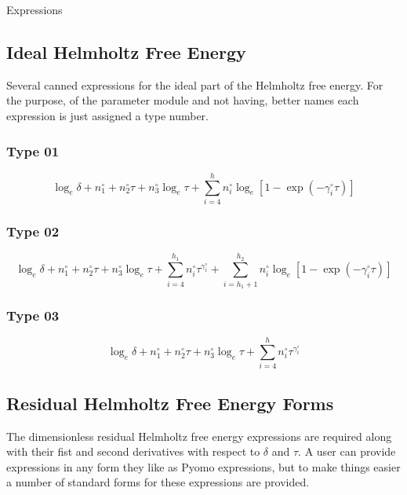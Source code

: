 \documentclass[oneside]{book}
\begin{document}
Expressions 

\subsection{Ideal Helmholtz Free Energy} 

Several canned expressions for the ideal part of the Helmholtz free energy.  For the purpose, of the parameter module and not having, better names each
expression is just assigned a type number.  

\subsubsection{Type 01}

\begin{equation}
	\log_e \delta + n^\circ_1 + n^\circ_2 \tau + n^\circ_3 \log_e \tau + \sum_{i = 4}^h n^\circ_i \log_e \left[ 1 - \exp(-\gamma^\circ_i  \tau)\right]
\end{equation}

\subsubsection{Type 02}

\begin{equation}
	\log_e \delta + n^\circ_1 + n^\circ_2 \tau + n^\circ_3 \log_e \tau  + \sum_{i = 4}^{h_1} n^\circ_i  \tau^{\gamma^\circ_i} + \sum_{i = h_1 + 1}^{h_2} n^\circ_i \log_e \left[ 1 - \exp(-\gamma^\circ_i  \tau)\right]
\end{equation}

\subsubsection{Type 03}

\begin{equation}
	\log_e \delta + n^\circ_1 + n^\circ_2 \tau + n^\circ_3 \log_e \tau  + \sum_{i = 4}^{h} n^\circ_i  \tau^{\gamma^\circ_i} 
\end{equation}

\subsection{Residual Helmholtz Free Energy Forms} 

The dimensionless residual Helmholtz free energy expressions are required along with their fist and second derivatives with respect to $\delta$ and $\tau$.  
A user can provide expressions in any form they like as Pyomo expressions, but to make things easier a number of standard forms for these expressions are
provided. 
 
\end{document}
